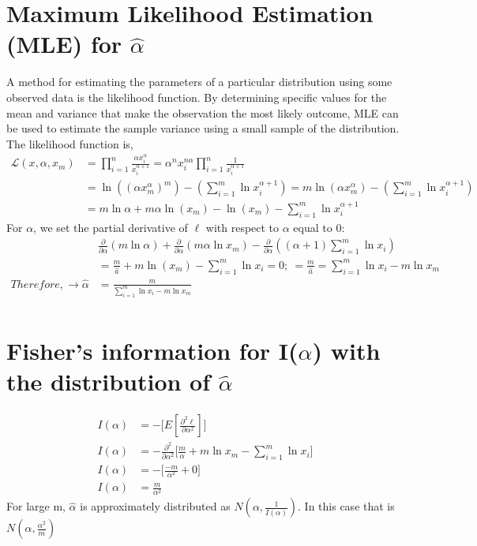 \documentclass[11pt]{article}
\begin{document}
\section{Maximum Likelihood Estimation (MLE) for $\hat{\alpha}$}
A method for estimating the parameters of a particular distribution using some observed data is the likelihood function. By determining specific values for the mean and variance that make the observation the most likely outcome, MLE can be used to estimate the sample variance using a small sample of the distribution. The likelihood function is,
\begin{align*}
\mathcal{L}(x,\alpha,x_m) &= \prod\limits^n_{i=1} {\frac{\alpha x_i^\alpha}{x_i^{\alpha+1}}} =\alpha^n{x_i^{n\alpha}}\prod\limits^n_{i=1} {\frac{1}{x_i^{\alpha+1}}}\\
&=\ln \left(\left(\alpha x_m^\alpha\right)^m\right)- \left(\sum_{i=1}^m\ln x_i^{\alpha+1}\right) =m \ln \left(\alpha x_m^\alpha\right)- \left(\sum_{i=1}^m\ln x_i^{\alpha+1}\right)\\
&=m \ln \alpha+m \alpha \ln \left(x_m\right)-\ln \left(x_m\right)-\sum_{i=1}^m\ln x_i^{\alpha+1}
\end{align*}
For $\alpha$, we set the partial derivative of $\ell$ with respect to $\alpha$ equal to 0:
$$
\begin{aligned} 
&\frac{\partial}{\partial \alpha}(m \ln \alpha)+\frac{\partial}{\partial \alpha}\left(m \alpha \ln x_m\right)-\frac{\partial}{\partial \alpha}\left((\alpha+1)\sum_{i=1}^m\ln x_i\right)\\
&=\frac{m}{\hat{a}}+m \ln \left(x_m\right)- \sum_{i=1}^m\ln x_i=0;\ =\frac{m}{\hat{a}}= \sum_{i=1}^m\ln x_i-m \ln x_m\\
Therefore, \rightarrow \hat{\alpha} &= {\frac{m}{\sum_{i=1}^m\ln x_i-m \ln {x_m}}} \label{eq:MLE} \\
\end{aligned}
$$

\section{Fisher's information for I($\alpha$) with the distribution of $\hat{\alpha}$}
\label{eq:Fishers}
\begin{align*}
I(\alpha) &= -\biggl[E\left[{\frac{\partial^{2}\ell}{\partial\alpha^{2}}}\right]\biggr] \\
I(\alpha) &= -{\frac{\partial^2}{\partial \alpha^2}}\Biggl[{\frac{m}{\alpha}}+m\ln{x_m} -{\sum_{i=1}^{m}\ln{x_i}}\Biggr]\\
I(\alpha) &= -\biggl[{\frac{-m}{\alpha^{2}} + 0}\biggr]\\
I(\alpha) &= {\frac{m}{\alpha^2}}  
\end{align*}
For large m, $\hat\alpha$ is approximately distributed as $N(\alpha,\frac{1}{I(\alpha)})$. In this case that is $N(\alpha,\frac{\alpha^2}{m})$
\end{document}
